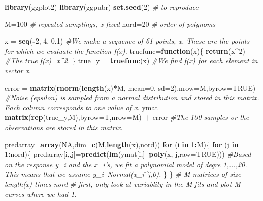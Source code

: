 \documentclass[]{article}
\newenvironment{Shaded}{\begin{snugshade}}{\end{snugshade}}
\newcommand{\CommentTok}[1]{\textcolor[rgb]{0.56,0.35,0.01}{\textit{#1}}}
\newcommand{\ControlFlowTok}[1]{\textcolor[rgb]{0.13,0.29,0.53}{\textbf{#1}}}
\newcommand{\DataTypeTok}[1]{\textcolor[rgb]{0.13,0.29,0.53}{#1}}
\newcommand{\DecValTok}[1]{\textcolor[rgb]{0.00,0.00,0.81}{#1}}
\newcommand{\FloatTok}[1]{\textcolor[rgb]{0.00,0.00,0.81}{#1}}
\newcommand{\KeywordTok}[1]{\textcolor[rgb]{0.13,0.29,0.53}{\textbf{#1}}}
\newcommand{\NormalTok}[1]{#1}
\newcommand{\OperatorTok}[1]{\textcolor[rgb]{0.81,0.36,0.00}{\textbf{#1}}}
\newcommand{\OtherTok}[1]{\textcolor[rgb]{0.56,0.35,0.01}{#1}}
\newcommand{\StringTok}[1]{\textcolor[rgb]{0.31,0.60,0.02}{#1}}
\begin{document}
\begin{Shaded}
\begin{Highlighting}[]
\KeywordTok{library}\NormalTok{(ggplot2)}
\KeywordTok{library}\NormalTok{(ggpubr)}
\KeywordTok{set.seed}\NormalTok{(}\DecValTok{2}\NormalTok{) }\CommentTok{# to reproduce}

\NormalTok{M=}\DecValTok{100} \CommentTok{# repeated samplings, x fixed }
\NormalTok{nord=}\DecValTok{20} \CommentTok{# order of polynoms}


\NormalTok{x =}\StringTok{ }\KeywordTok{seq}\NormalTok{(}\OperatorTok{-}\DecValTok{2}\NormalTok{, }\DecValTok{4}\NormalTok{, }\FloatTok{0.1}\NormalTok{) }\CommentTok{#We make a sequence of 61 points, x. These are the points for which we evaluate the function f(x).}
\NormalTok{truefunc=}\ControlFlowTok{function}\NormalTok{(x)\{}
  \KeywordTok{return}\NormalTok{(x}\OperatorTok{^}\DecValTok{2}\NormalTok{) }\CommentTok{#The true f(x)=x^2. }
\NormalTok{\}}
\NormalTok{true_y =}\StringTok{ }\KeywordTok{truefunc}\NormalTok{(x) }\CommentTok{#We find f(x) for each element in vector x.}

\NormalTok{error =}\StringTok{ }\KeywordTok{matrix}\NormalTok{(}\KeywordTok{rnorm}\NormalTok{(}\KeywordTok{length}\NormalTok{(x)}\OperatorTok{*}\NormalTok{M, }\DataTypeTok{mean=}\DecValTok{0}\NormalTok{, }\DataTypeTok{sd=}\DecValTok{2}\NormalTok{),}\DataTypeTok{nrow=}\NormalTok{M,}\DataTypeTok{byrow=}\OtherTok{TRUE}\NormalTok{) }\CommentTok{#Noise (epsilon) is sampled from a normal distribution and stored in this matrix. Each column corresponds to one value of x.}
\NormalTok{ymat =}\StringTok{ }\KeywordTok{matrix}\NormalTok{(}\KeywordTok{rep}\NormalTok{(true_y,M),}\DataTypeTok{byrow=}\NormalTok{T,}\DataTypeTok{nrow=}\NormalTok{M) }\OperatorTok{+}\StringTok{ }\NormalTok{error }\CommentTok{#The 100 samples or the observations are stored in this matrix.}

\NormalTok{predarray=}\KeywordTok{array}\NormalTok{(}\OtherTok{NA}\NormalTok{,}\DataTypeTok{dim=}\KeywordTok{c}\NormalTok{(M,}\KeywordTok{length}\NormalTok{(x),nord))}
\ControlFlowTok{for}\NormalTok{ (i }\ControlFlowTok{in} \DecValTok{1}\OperatorTok{:}\NormalTok{M)\{}
  \ControlFlowTok{for}\NormalTok{ (j }\ControlFlowTok{in} \DecValTok{1}\OperatorTok{:}\NormalTok{nord)\{}
\NormalTok{    predarray[i,,j]=}\KeywordTok{predict}\NormalTok{(}\KeywordTok{lm}\NormalTok{(ymat[i,]}\OperatorTok{~}\KeywordTok{poly}\NormalTok{(x, j,}\DataTypeTok{raw=}\OtherTok{TRUE}\NormalTok{)))}
    \CommentTok{#Based on the response y_i and the x_i's, we fit a polynomial model of degre 1,...,20. This means that we assume y_i~Normal(x_i^j,0). }
\NormalTok{  \}}
\NormalTok{\}}
\CommentTok{# M matrices of size length(x) times nord}
\CommentTok{# first, only look at variablity in the M fits and plot M curves where we had 1.}


\end{Highlighting}
\end{Shaded}
\end{document}

